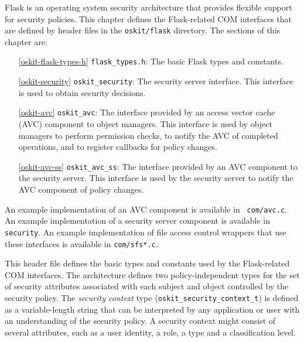 %
% 
% 
%
\label{oskit-flask}

Flask is an operating system security architecture that
provides flexible support for security policies.  This chapter defines
the Flask-related COM interfaces that are defined by header files in
the \texttt{oskit/flask} directory.  The sections of this chapter are:
\begin{itemize}
\item[\ref{oskit-flask-types-h}] {\tt flask_types.h}:
	The basic Flask types and constants.
\item[\ref{oskit-security}] {\tt oskit_security}:
	The security server interface.  This interface is used to
        obtain security decisions.
\item[\ref{oskit-avc}] {\tt oskit_avc}:
	The interface provided by an access vector cache (AVC) component to
	object managers.  This interface is used by object managers
	to perform permission checks, to notify the AVC of completed
	operations, and to register callbacks for policy changes.
\item[\ref{oskit-avc-ss}] {\tt oskit_avc_ss}:
	The interface provided by an AVC component to the security
	server.  This interface is used by the security server
	to notify the AVC component of policy changes.
\end{itemize}

An example implementation of an AVC component is available in {\tt
com/avc.c}.  An example implementation of a
security server component is available in {\tt security}.  An
example implementation of file access control wrappers that use these
interfaces is available in {\tt com/sfs*.c}.

\label{oskit-flask-types-h}

	This header file defines the basic types and constants
used by the Flask-related COM interfaces.
The architecture defines two policy-independent types for the set of
security attributes associated with each subject and object controlled
by the security policy.  The \emph{security context} type 
(\texttt{oskit_security_context_t}) is defined
as a variable-length string that can be interpreted by any application
or user with an understanding of the security policy.  A security
context might consist of several attributes, such as a user identity,
a role, a type and a classification level.

